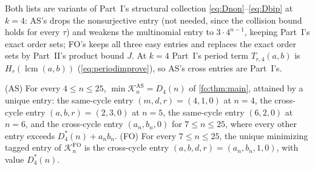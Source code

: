 \documentclass[11pt,a4paper]{article}
\numberwithin{equation}{section}
\theoremstyle{definition}
\theoremstyle{remark}
\newcommand{\lcm}{\operatorname{lcm}}
\begin{document}
Both lists are variants of Part~I's structural collection
\eqref{eq:Dnon}--\eqref{eq:Dbip} at $k=4$: AS's drops the nonsurjective entry
(not needed, since the collision bound holds for every $\tau$) and weakens the
multinomial entry to $3\cdot4^{n-1}$, keeping Part~I's exact order sets; FO's
keeps all three easy entries and replaces the exact order sets by Part~II's
product bound $J$. At $k=4$ Part~I's period term $T_{r,4}(a,b)$ is
$H_r(\lcm(a,b))$ (\eqref{eq:periodimprove}), so AS's cross entries are
Part~I's.

\begin{proposition}\label{fo:prop:finite}
\textup{(AS)} For every $4\le n\le25$, $\min\mathcal K^{\mathrm{AS}}_n=D_4(n)$ of
\cref{fo:thm:main}, attained by a unique entry: the same-cycle entry
$(m,d,r)=(4,1,0)$ at $n=4$, the cross-cycle entry $(a,b,r)=(2,3,0)$ at $n=5$,
the same-cycle entry $(6,2,0)$ at $n=6$, and the cross-cycle entry
$(a_n,b_n,0)$ for $7\le n\le25$, where every other entry exceeds
$D^*_4(n)+a_nb_n$. \textup{(FO)} For every $7\le n\le25$, the unique minimizing
tagged entry of $\mathcal K^{\mathrm{FO}}_n$ is the cross-cycle entry
$(a,b,d,r)=(a_n,b_n,1,0)$, with value $D^*_4(n)$.
\end{proposition}
\end{document}
